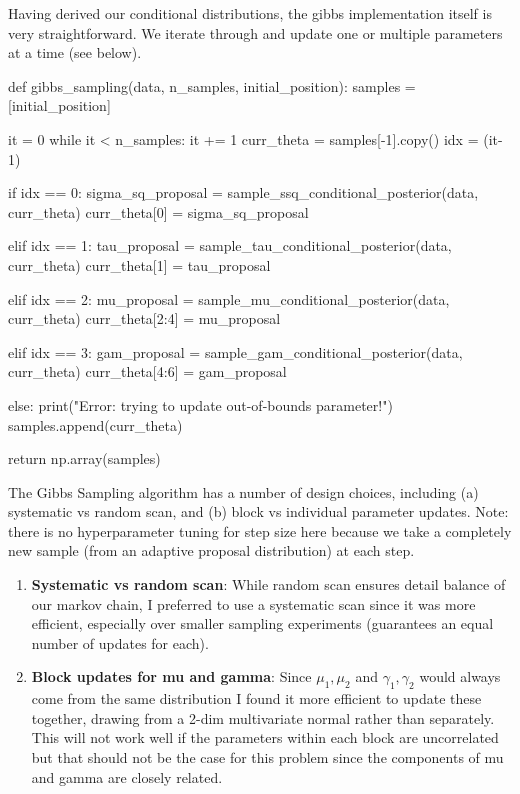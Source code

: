 \documentclass[12pt,letterpaper,twoside]{article}
\begin{document}
Having derived our conditional distributions, the gibbs implementation
itself is very straightforward. We iterate through and update one or 
multiple parameters at a time (see below).  
\begin{python}
def gibbs_sampling(data, n_samples, initial_position):
    samples = [initial_position]

    it = 0
    while it < n_samples:
        it += 1
        curr_theta = samples[-1].copy()
        idx = (it-1) %

        if idx == 0:
            sigma_sq_proposal = sample_ssq_conditional_posterior(data, curr_theta)
            curr_theta[0] = sigma_sq_proposal

        elif idx == 1:
            tau_proposal = sample_tau_conditional_posterior(data, curr_theta)
            curr_theta[1] = tau_proposal

        elif idx == 2:
            mu_proposal = sample_mu_conditional_posterior(data, curr_theta)
            curr_theta[2:4] = mu_proposal

        elif idx == 3:
            gam_proposal = sample_gam_conditional_posterior(data, curr_theta)
            curr_theta[4:6] = gam_proposal

        else:
            print("Error: trying to update out-of-bounds parameter!")
        samples.append(curr_theta)

    return np.array(samples)
\end{python}

The Gibbs Sampling algorithm has a number of design 
choices, including (a) systematic vs random scan, and
(b) block vs individual parameter updates. Note: there 
is no hyperparameter tuning for step size here because 
we take a completely new sample (from an adaptive proposal 
distribution) at each step.

\begin{enumerate}[label=(\alph*)]
\item \textbf{Systematic vs random scan}: While random scan ensures 
detail balance of our markov chain, I preferred to use a 
systematic scan since it was more efficient, especially over 
smaller sampling experiments (guarantees an equal number of 
updates for each).

\item \textbf{Block updates for mu and gamma}: Since $\mu_1, \mu_2$ 
and $\gamma_1, \gamma_2$ would always come from the same 
distribution I found it more efficient to update these together, 
drawing from a 2-dim multivariate normal rather than separately. 
This will not work well if the parameters within each block are 
uncorrelated but that should not be the case for this problem since 
the components of mu and gamma are closely related.
\end{enumerate}
\end{document}

